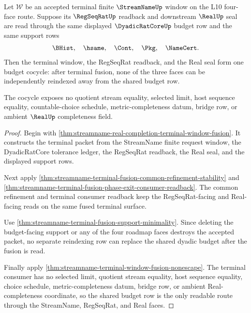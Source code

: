\begin{theorem}
\label{thm:streamname-regseqrat-real-budget-cocycle}
Let $\mathcal W$ be an accepted terminal finite $\StreamNameUp$ window on the
L10 four-face route. Suppose its $\RegSeqRatUp$ readback and downstream
$\RealUp$ seal are read through the same displayed $\DyadicRatCoreUp$ budget
row and the same support rows
$$
\BHist,\quad \hsame,\quad \Cont,\quad \Pkg,\quad \NameCert.
$$
Then the terminal window, the RegSeqRat readback, and the Real seal form one
budget cocycle: after terminal fusion, none of the three faces can be
independently reindexed away from the shared budget row.

The cocycle exposes no quotient stream equality, selected limit, host sequence
equality, countable-choice schedule, metric-completeness datum, bridge row, or
ambient $\RealUp$ completeness field.
\end{theorem}
\begin{proof}
Begin with \autoref{thm:streamname-real-completion-terminal-window-fusion}. It
constructs the terminal packet from the StreamName finite request window, the
DyadicRatCore tolerance ledger, the RegSeqRat readback, the Real seal, and the
displayed support rows.

Next apply \autoref{thm:streamname-terminal-fusion-common-refinement-stability}
and \autoref{thm:streamname-terminal-fusion-phase-exit-consumer-readback}. The
common refinement and terminal consumer readback keep the RegSeqRat-facing and
Real-facing reads on the same fused terminal surface.

Use \autoref{thm:streamname-terminal-fusion-support-minimality}. Since deleting
the budget-facing support or any of the four roadmap faces destroys the
accepted packet, no separate reindexing row can replace the shared dyadic
budget after the fusion is read.

Finally apply \autoref{thm:streamname-terminal-window-fusion-nonescape}. The
terminal consumer has no selected limit, quotient stream equality, host
sequence equality, choice schedule, metric-completeness datum, bridge row, or
ambient Real-completeness coordinate, so the shared budget row is the only
readable route through the StreamName, RegSeqRat, and Real faces.
\end{proof}
